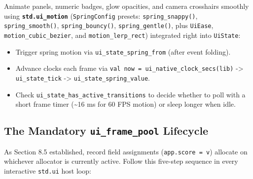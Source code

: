 \documentclass[
  english,
  oneside]{book}
\providecommand{\tightlist}{%
  \setlength{\itemsep}{0pt}\setlength{\parskip}{0pt}}
\begin{document}
Animate panels, numeric badges, glow opacities, and camera crosshairs
smoothly using \textbf{\texttt{std.ui\_motion}} (\texttt{SpringConfig}
presets: \texttt{spring\_snappy()}, \texttt{spring\_smooth()},
\texttt{spring\_bouncy()}, \texttt{spring\_gentle()}, plus
\texttt{UiEase}, \texttt{motion\_cubic\_bezier}, and
\texttt{motion\_lerp\_rect}) integrated right into \texttt{UiState}:

\begin{itemize}
\tightlist
\item
  Trigger spring motion via \texttt{ui\_state\_spring\_from} (after
  event folding).
\item
  Advance clocks each frame via
  \texttt{val\ now\ =\ ui\_native\_clock\_secs(lib)} -\textgreater{}
  \texttt{ui\_state\_tick} -\textgreater{}
  \texttt{ui\_state\_spring\_value}.
\item
  Check \texttt{ui\_state\_has\_active\_transitions} to decide whether
  to poll with a short frame timer (\textasciitilde16 ms for 60 FPS
  motion) or sleep longer when idle.
\end{itemize}

\subsection{\texorpdfstring{The Mandatory \texttt{ui\_frame\_pool}
Lifecycle}{The Mandatory ui\_frame\_pool Lifecycle}}\label{the-mandatory-ui_frame_pool-lifecycle}

As Section 8.5 established, record field assignments
(\texttt{app.score\ =\ v}) allocate on whichever allocator is currently
active. Follow this five-step sequence in every interactive
\texttt{std.ui} host loop:
\end{document}
